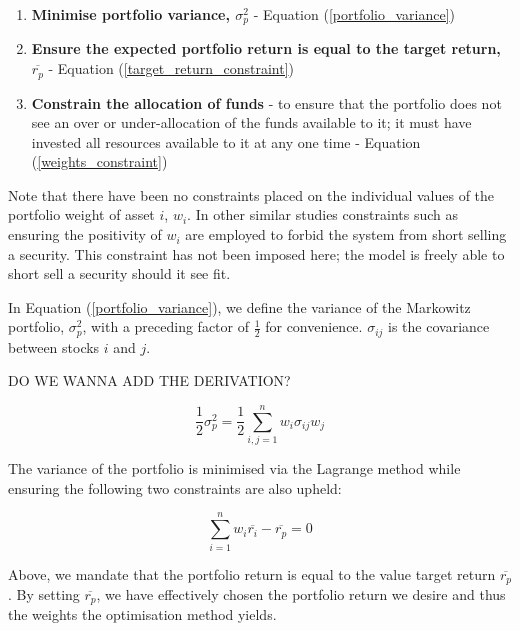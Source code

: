\documentclass{article}
\begin{document}
\begin{enumerate}
	\item \textbf{Minimise portfolio variance, $\sigma_p^2$}  - Equation (\ref{portfolio_variance})

	\item \textbf{Ensure the expected portfolio return is equal to the target return, $\overline{r_p}$} - Equation (\ref{target_return_constraint})
	
	\item \textbf{Constrain the allocation of funds} - to ensure that the portfolio does not see an over or under-allocation of the funds available to it; it must have invested all resources available to it at any one time - Equation (\ref{weights_constraint})
	
\end{enumerate}

Note that there have been no constraints placed on the individual values of the portfolio weight of asset $i$, $w_i$. In other similar studies constraints such as ensuring the positivity of $w_i$ are employed to forbid the system from short selling a security. This constraint has not been imposed here; the model is freely able to short sell a security should it see fit.

In Equation (\ref{portfolio_variance}), we define the variance of the Markowitz portfolio, $\sigma_{p}^{2}$, with a preceding factor of $\frac{1}{2}$ for convenience. $\sigma_{ij}$ is the covariance between stocks $i$ and $j$.

DO WE WANNA ADD THE DERIVATION?

\begin{equation}
\dfrac{1}{2} \sigma^{2}_{p} =  \dfrac{1}{2} \sum_{i,j=1}^{n} w_{i} \sigma_{ij} w_{j}
\label{portfolio_variance}
\end{equation}

The variance of the portfolio is minimised via the Lagrange method while ensuring the following two constraints are also upheld:

\begin{equation}
\sum_{i=1}^{n} w_{i} \overline{r_i} - \overline{r_p} = 0
\label{target_return_constraint}
\end{equation}

Above, we mandate that the portfolio return is equal to the value target return $\overline{r_p}$. By setting $\overline{r_p}$, we have effectively chosen the portfolio return we desire and thus the weights the optimisation method yields.
\end{document}
